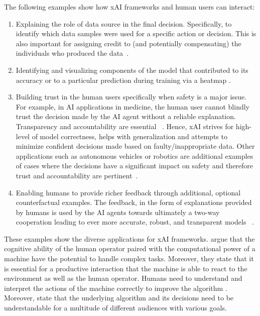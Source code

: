 \documentclass[twoside,11pt]{article}
\begin{document}
\begin{enumerate}
The following examples show how xAI frameworks and human users can interact:
\begin{enumerate}
\item Explaining the role of data source in the final decision. Specifically, to identify which data samples were used for a specific action or decision. This is also important for assigning credit to (and potentially compensating) the individuals who produced the data~\citep{zanzotto2019human}. 
\item Identifying and visualizing components of the model that contributed to its accuracy or to a particular prediction during training via a heatmap \citep{SturmEtAl:2015:InteractiveHeatmap}.
\item Building trust in the human users specifically when safety is a major issue. For example, in AI applications in medicine, the human user cannot blindly trust the decision made by the AI agent without a reliable explanation. Transparency and accountability are essential ~\citep{Schneeberger:2020:legalAI, Stoeger:2021:MedicalAI}. Hence, xAI strives for high-level of model correctness, helps with generalization and attempts to minimize confident decisions made based on faulty/inappropriate data. Other applications such as autonomous vehicles or robotics are additional examples of cases where the decisions have a significant impact on safety and therefore trust and accountability are pertinent~\citep{araiza2019safe, WellsBednarz:2021:xAIRLSurvey}.
\item Enabling humans to provide richer feedback through additional, optional counterfactual examples. The feedback, in the form of explanations provided by humans is used by the AI agents towards ultimately a two-way cooperation leading to ever more accurate, robust, and transparent models ~\citep{Karalus:2021:HITL-counterfactuals,PuiuttaVeith:2020:xAIRLSurvey}.   
\end{enumerate}

These examples show the diverse applications for xAI frameworks. \citet{LiangEtAl:2017:HITLReinforcementLearn} argue that the cognitive ability of the human operator paired with the computational power of a machine have the potential to handle complex tasks. Moreover, they state that it is essential for a productive interaction that the machine is able to react to the environment as well as the human operator. Humans need to understand and interpret the actions of the machine correctly to improve the algorithm \citep{heuillet2021explainability}. Moreover, \citet{heuillet2021explainability} state that the underlying algorithm and its decisions need to be understandable for a multitude of different audiences with various goals.


\end{enumerate}
\end{document}
